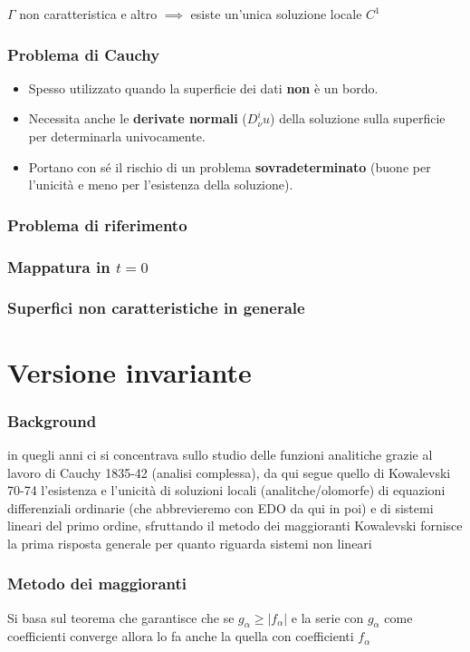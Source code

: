 \documentclass[serif,notheorems]{beamer}
\theoremstyle{plain} %
\theoremstyle{definition} %
\theoremstyle{remark}
\begin{document}
\begin{frame}
$\Gamma$ non caratteristica e altro $\implies$ esiste un'unica soluzione locale $C^1$
\end{frame}

\begin{frame}
\frametitle{Problema di Cauchy}
\begin{itemize}
\item Spesso utilizzato quando la superficie dei dati \textbf{non} è un bordo.
\item Necessita anche le \textbf{derivate normali} ($D^i_\nu u$) della soluzione sulla superficie per determinarla univocamente.
\item Portano con sé il rischio di un problema \textbf{sovradeterminato} (buone per l'unicità e meno per l'esistenza della soluzione).
\end{itemize}
\end{frame}

\begin{frame}
\frametitle{Problema di riferimento}
\end{frame}

\begin{frame}
\frametitle{Mappatura in $t=0$}
\end{frame}

\begin{frame}
\frametitle{Superfici non caratteristiche in generale}
\end{frame}


\section{Versione invariante}

\begin{frame}
\frametitle{Background}
in quegli anni ci si concentrava sullo studio delle funzioni analitiche grazie al lavoro di Cauchy 1835-42 (analisi complessa), da qui segue quello di Kowalevski 70-74
l'esistenza e l'unicità di soluzioni locali (analitche/olomorfe) di equazioni differenziali ordinarie (che abbrevieremo con EDO da qui in poi) e di sistemi lineari del primo ordine, sfruttando il metodo dei maggioranti 
Kowalevski fornisce la prima risposta generale per quanto riguarda sistemi non lineari
\end{frame}

\begin{frame}
\frametitle{Metodo dei maggioranti}
Si basa sul teorema che garantisce che se $g_\alpha \geq |f_\alpha|$ e la serie con $g_\alpha$ come coefficienti converge allora lo fa anche la quella con coefficienti $f_\alpha$
\end{frame}
\end{document}
